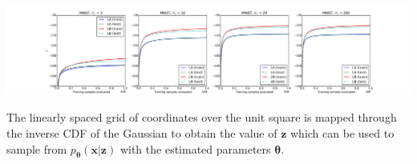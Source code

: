 \documentclass[landscape,a0b,final,a4resizeable]{include/a0poster}
\begin{document}
\begin{poster}
\begin{multicols}{3}
\vspace{0.5em}

\begin{center}
\includegraphics[width=1\columnwidth]{../res/mnist_LAvsLB}
\end{center}

\vspace{0.5em}


The linearly spaced grid of coordinates over the unit square is mapped through the inverse CDF of the Gaussian to obtain the value of $\mathbf{z}$ which can be used to sample from $p_{\mathbf{\theta}} (\mathbf{x}| \mathbf{z})$ with the estimated parameters $\boldsymbol{\theta}$.

\vspace{0.5em}


\end{multicols}
\end{poster}
\end{document}
